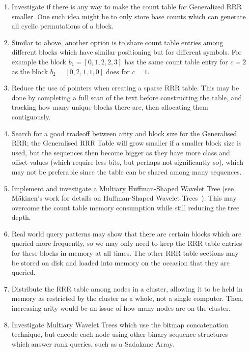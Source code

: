 \begin{enumerate}
\item
	Investigate if there is any way to make the count table for Generalized RRR 
	smaller. One such idea might be to only store base counts which can
	generate all cyclic permutations of a block.
	
\item
	Similar to above, another option is to share count table entries among 
	different blocks which have similar positioning but for different symbols. 
	For example the block $b_1 = [0, 1, 2, 2, 3]$ has the same count table entry 
	for $c = 2$ as the block $b_2 = [0, 2, 1, 1, 0]$ does for $c = 1$.
	
\item
	Reduce the use of pointers when creating a sparse RRR table. This may be
	done by completing a full scan of the text before constructing the table,
	and tracking how many unique blocks there are, then allocating them 
	contiguously.

\item
 	Search for a good tradeoff between arity and block size for the
	Generalised RRR; the Generalised RRR Table will grow smaller if a smaller 
	block size is used, but the sequences then become bigger as they have more
	class and offset values (which require less bits, but perhaps not 
	significantly so), which may not be preferable since the table can be shared 
	among many sequences.

\item
	Implement and investigate a Multiary Huffman-Shaped Wavelet Tree (see 
	M\"{a}kinen's work for details on Huffman-Shaped Wavelet
	Trees~\cite{makinen2005}). This may
	overcome the count table memory consumption while still reducing the tree 
	depth.

\item
	Real world query patterns may show that there are certain blocks which are 
	queried more frequently, so we may only need to keep the RRR table entries
	for these blocks in memory at all times. The other RRR table sections may be 
	stored on disk and loaded into memory on the occasion that they are queried.

\item
	Distribute the RRR table among nodes in a cluster, allowing it to be
	held in memory as restricted by the cluster as a whole, not a single
	computer. Then, increasing arity would be an issue of how many nodes are
	on the cluster.

\item
	Investigate Multiary Wavelet Trees which use the bitmap concatenation 
	technique, but encode each node using other binary sequence structures which 
	answer rank queries, such as a Sadakane Array.

\end{enumerate}